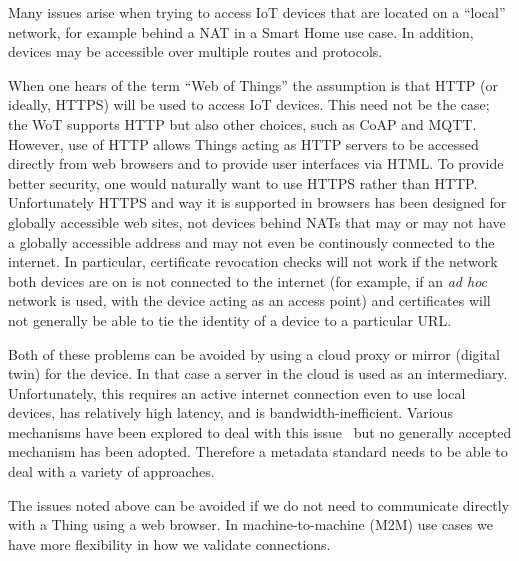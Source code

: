 Many issues arise when trying to access IoT devices
that are located on a ``local'' network,
for example behind a NAT in a Smart Home use case.
In addition, devices may be accessible over multiple
routes and protocols.

When one hears of the term ``Web of Things'' the
assumption is that HTTP (or ideally, HTTPS) will be used to
access IoT devices. 
This need not be the case;
the WoT supports HTTP but also 
other choices, such as CoAP and MQTT.
However, use of HTTP
allows Things acting as HTTP servers to be accessed directly
from web browsers and to provide user interfaces via HTML.  
To provide better security, one would
naturally want to use HTTPS rather than HTTP.
Unfortunately HTTPS and way it is supported in browsers has
been designed for globally accessible web sites, not devices
behind NATs that may or may not have a globally accessible
address and may not even be continously connected to the internet.
In particular, certificate revocation checks will not work if
the network both devices are on is not connected to the internet
(for example, if an \textit{ad hoc} network is used, with the device acting as
an access point) and certificates will not generally be able 
to tie the identity of a device to a particular URL. 

Both of these problems can be avoided by using a cloud proxy
or mirror (digital twin) for the device.
In that case a server
in the cloud is used as an intermediary.
Unfortunately,
this requires an active internet connection even to use 
local devices, has relatively high latency, and is
bandwidth-inefficient.
Various mechanisms have been explored to deal with this issue~\cite{httpslocal2017}
but no generally accepted mechanism has been adopted.
Therefore a metadata standard needs to be able to deal with a variety
of approaches.

The issues noted above can be avoided if we do not need
to communicate directly with a Thing using a web browser.  
In machine-to-machine (M2M) use cases
we have more flexibility in how we validate connections.

